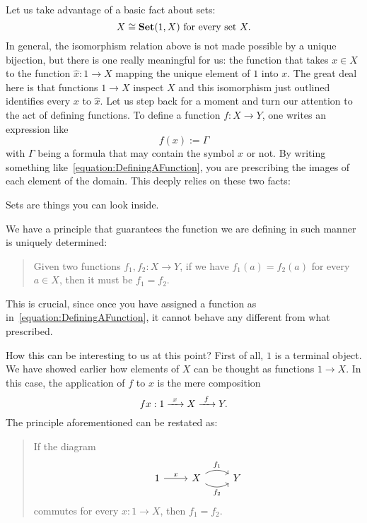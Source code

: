 \begin{exercise}
Let us take advantage of a basic fact about sets:
\[X \cong \mathbf{Set}(1, X) \text{ for every set } X .\]
In general, the isomorphism relation above is not made possible by a unique bijection, but there is one really meaningful for us: the function that takes \(x \in X\) to the function \(\hat x : 1 \to X\) mapping the unique element of \(1\) into \(x\). The great deal here is that functions \(1 \to X\) inspect \(X\) and this isomorphism just outlined identifies every \(x\) to \(\hat x\).\newline
Let us step back for a moment and turn our attention to the act of defining functions. To define a function \(f : X \to Y\), one writes an expression like
\begin{equation}
f(x) := \Gamma \label{equation:DefiningAFunction}
\end{equation}
with \(\Gamma\) being a formula that may contain the symbol \(x\) or not. By writing something like~\eqref{equation:DefiningAFunction}, you are prescribing the images of each element of the domain. This deeply relies on these two facts:
\begin{tcbenum}
\item Sets are things you can look inside.
\item We have a principle that guarantees the function we are defining in such manner is uniquely determined:
\begin{quotation}
Given two functions \(f_1, f_2 : X \to Y\), if we have \(f_1(a) = f_2(a)\) for every \(a \in X\), then it must be \(f_1 = f_2\).
\end{quotation}
This is crucial, since once you have assigned a function as in~\eqref{equation:DefiningAFunction}, it cannot behave any different from what prescribed.
\end{tcbenum}
How this can be interesting to us at this point? First of all, \(1\) is a terminal object. We have showed earlier how elements of \(X\) can be thought as functions \(1 \to X\). In this case, the application of \(f\) to \(x\) is the mere composition
\[f x : 1 \xrightarrow{\ x\ } X \xrightarrow{\ f\ } Y .\]
The principle aforementioned can be restated as:
\begin{quotation}
If the diagram
\[\begin{tikzcd}
1 \ar["x", r] & X \ar["{f_1}", r, bend left] \ar["{f_2}", r, bend right, swap] & Y
\end{tikzcd}\]
commutes for every \(x : 1 \to X\), then \(f_1 = f_2\).
\end{quotation}
\end{exercise}

